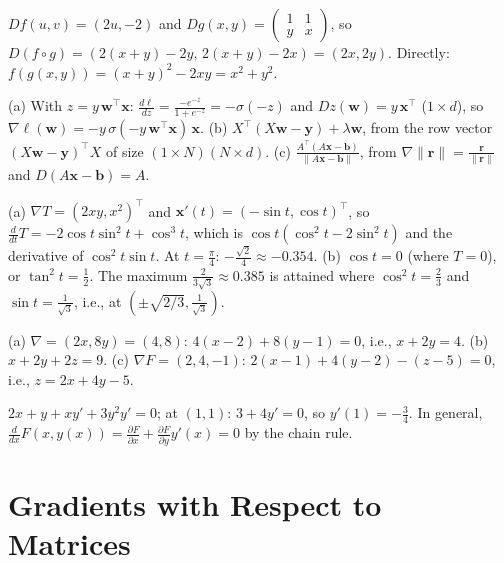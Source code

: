 \documentclass[11pt]{article}
\newcommand{\norm}[1]{\lVert #1 \rVert}
\begin{document}
\begin{description}[leftmargin=0pt, itemsep=0.3em]
    \item[\ref{pr:chain-compose}.] $Df(u, v) = (2u, -2)$ and $Dg(x, y) = \begin{pmatrix} 1 & 1 \\ y & x \end{pmatrix}$, so $D(f \circ g) = (2(x + y) - 2y, \, 2(x + y) - 2x) = (2x, 2y)$. Directly: $f(g(x, y)) = (x + y)^2 - 2xy = x^2 + y^2$.
    \item[\ref{pr:loss-gradients}.] (a) With $z = y\,\mathbf{w}^\top\mathbf{x}$: $\frac{d\ell}{dz} = \frac{-e^{-z}}{1 + e^{-z}} = -\sigma(-z)$ and $Dz(\mathbf{w}) = y\,\mathbf{x}^\top$ ($1 \times d$), so $\nabla\ell(\mathbf{w}) = -y\,\sigma(-y\,\mathbf{w}^\top\mathbf{x})\,\mathbf{x}$. (b) $X^\top(X\mathbf{w} - \mathbf{y}) + \lambda\mathbf{w}$, from the row vector $(X\mathbf{w} - \mathbf{y})^\top X$ of size $(1 \times N)(N \times d)$. (c) $\frac{A^\top(A\mathbf{x} - \mathbf{b})}{\norm{A\mathbf{x} - \mathbf{b}}}$, from $\nabla\norm{\mathbf{r}} = \frac{\mathbf{r}}{\norm{\mathbf{r}}}$ and $D(A\mathbf{x} - \mathbf{b}) = A$.
    \item[\ref{pr:curve-temperature}.] (a) $\nabla T = (2xy, x^2)^\top$ and $\mathbf{x}'(t) = (-\sin t, \cos t)^\top$, so $\frac{d}{dt}T = -2\cos t\sin^2 t + \cos^3 t$, which is $\cos t(\cos^2 t - 2\sin^2 t)$ and the derivative of $\cos^2 t \sin t$. At $t = \frac{\pi}{4}$: $-\frac{\sqrt{2}}{4} \approx -0.354$. (b) $\cos t = 0$ (where $T = 0$), or $\tan^2 t = \frac{1}{2}$. The maximum $\frac{2}{3\sqrt{3}} \approx 0.385$ is attained where $\cos^2 t = \frac{2}{3}$ and $\sin t = \frac{1}{\sqrt{3}}$, i.e., at $(\pm\sqrt{2/3}, \frac{1}{\sqrt{3}})$.
    \item[\ref{pr:tangent}.] (a) $\nabla = (2x, 8y) = (4, 8)$: $4(x - 2) + 8(y - 1) = 0$, i.e., $x + 2y = 4$. (b) $x + 2y + 2z = 9$. (c) $\nabla F = (2, 4, -1)$: $2(x - 1) + 4(y - 2) - (z - 5) = 0$, i.e., $z = 2x + 4y - 5$.
    \item[\ref{pr:implicit}.] $2x + y + xy' + 3y^2 y' = 0$; at $(1, 1)$: $3 + 4y' = 0$, so $y'(1) = -\frac{3}{4}$. In general, $\frac{d}{dx}F(x, y(x)) = \frac{\partial F}{\partial x} + \frac{\partial F}{\partial y}y'(x) = 0$ by the chain rule.
\end{description}

\section*{Gradients with Respect to Matrices}
\end{document}
